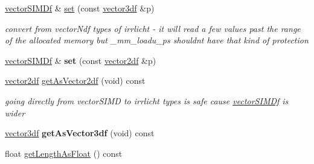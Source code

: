 \begin{DoxyCompactItemize}
\item 
\hyperlink{classirr_1_1core_1_1vectorSIMDf}{vector\+S\+I\+M\+Df} \& \hyperlink{classirr_1_1core_1_1vectorSIMDf_ae00cdb57cca255d4743faa27ff68c260}{set} (const \hyperlink{namespaceirr_1_1core_a06f169d08b5c429f5575acb7edbad811}{vector3df} \&p)\hypertarget{classirr_1_1core_1_1vectorSIMDf_ae00cdb57cca255d4743faa27ff68c260}{}\label{classirr_1_1core_1_1vectorSIMDf_ae00cdb57cca255d4743faa27ff68c260}

\begin{DoxyCompactList}\small\item\em convert from vector\+Ndf types of irrlicht -\/ it will read a few values past the range of the allocated memory but \+\_\+mm\+\_\+loadu\+\_\+ps shouldnt have that kind of protection \end{DoxyCompactList}\item 
\hyperlink{classirr_1_1core_1_1vectorSIMDf}{vector\+S\+I\+M\+Df} \& {\bfseries set} (const \hyperlink{namespaceirr_1_1core_a2cf08556d77f6f5a792973a6e27ed11b}{vector2df} \&p)\hypertarget{classirr_1_1core_1_1vectorSIMDf_a4a6b5b1edafb07d05054d66617243f45}{}\label{classirr_1_1core_1_1vectorSIMDf_a4a6b5b1edafb07d05054d66617243f45}

\item 
\hyperlink{namespaceirr_1_1core_a2cf08556d77f6f5a792973a6e27ed11b}{vector2df} \hyperlink{classirr_1_1core_1_1vectorSIMDf_a91036e3d48a765df0d27b10bea29d859}{get\+As\+Vector2df} (void) const \hypertarget{classirr_1_1core_1_1vectorSIMDf_a91036e3d48a765df0d27b10bea29d859}{}\label{classirr_1_1core_1_1vectorSIMDf_a91036e3d48a765df0d27b10bea29d859}

\begin{DoxyCompactList}\small\item\em going directly from vector\+S\+I\+MD to irrlicht types is safe cause \hyperlink{classirr_1_1core_1_1vectorSIMDf}{vector\+S\+I\+M\+Df} is wider \end{DoxyCompactList}\item 
\hyperlink{namespaceirr_1_1core_a06f169d08b5c429f5575acb7edbad811}{vector3df} {\bfseries get\+As\+Vector3df} (void) const \hypertarget{classirr_1_1core_1_1vectorSIMDf_a73d0987bcbabe94987a8b730ab5e244e}{}\label{classirr_1_1core_1_1vectorSIMDf_a73d0987bcbabe94987a8b730ab5e244e}

\item 
float \hyperlink{classirr_1_1core_1_1vectorSIMDf_a38b8ce5c27682aef634369b33114296f}{get\+Length\+As\+Float} () const \hypertarget{classirr_1_1core_1_1vectorSIMDf_a38b8ce5c27682aef634369b33114296f}{}\label{classirr_1_1core_1_1vectorSIMDf_a38b8ce5c27682aef634369b33114296f}


\end{DoxyCompactItemize}
